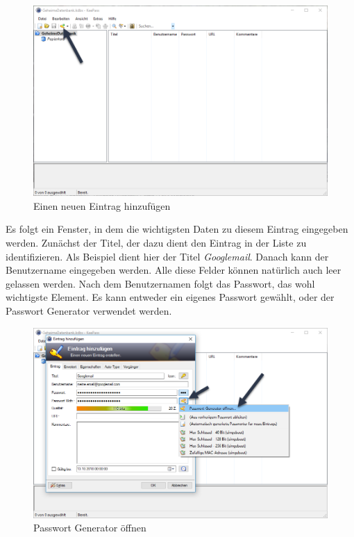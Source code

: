 \documentclass[12pt,a4paper]{scrreprt}
\begin{document}
\begin{figure}[h]
\begin{center}
\includegraphics[width=350pt]{media/knewentry1.png}
\caption{Einen neuen Eintrag hinzufügen}
\label{knewentry1}
\end{center}
\end{figure}

\noindent Es folgt ein Fenster, in dem die wichtigsten Daten zu diesem Eintrag eingegeben werden. Zunächst der Titel, der dazu dient den Eintrag in der Liste zu identifizieren. Als Beispiel dient hier der Titel \textit{Googlemail}. Danach kann der Benutzername eingegeben werden. Alle diese Felder können natürlich auch leer gelassen werden. Nach dem Benutzernamen folgt das Passwort, das wohl wichtigste Element. Es kann entweder ein eigenes Passwort gewählt, oder der Passwort Generator verwendet werden.

\begin{figure}[h]
\begin{center}
\includegraphics[width=350pt]{media/knewentry2.png}
\caption{Passwort Generator öffnen}
\label{knewentry2}
\end{center}
\end{figure}
\end{document}
